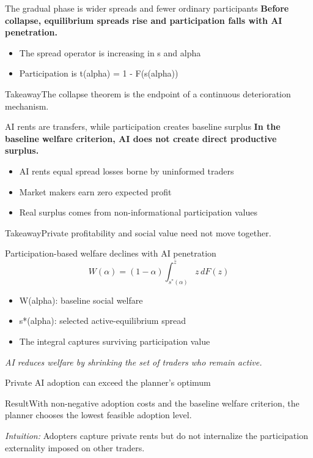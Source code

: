\documentclass[aspectratio=169,14pt]{beamer}
\begin{document}
\begin{frame}{The gradual phase is wider spreads and fewer ordinary participants}
\textbf{Before collapse, equilibrium spreads rise and participation falls with AI penetration.}
\begin{itemize}
  \item The spread operator is increasing in s and alpha
  \item Participation is t(alpha) = 1 - F(s(alpha))
\end{itemize}
\begin{block}{Takeaway}The collapse theorem is the endpoint of a continuous deterioration mechanism.\end{block}
\end{frame}

\begin{frame}{AI rents are transfers, while participation creates baseline surplus}
\textbf{In the baseline welfare criterion, AI does not create direct productive surplus.}
\begin{itemize}
  \item AI rents equal spread losses borne by uninformed traders
  \item Market makers earn zero expected profit
  \item Real surplus comes from non-informational participation values
\end{itemize}
\begin{block}{Takeaway}Private profitability and social value need not move together.\end{block}
\end{frame}

\begin{frame}{Participation-based welfare declines with AI penetration}
\begin{equation*}W(\alpha) = (1-\alpha) \int_{s^*(\alpha)}^{\bar z} z \,dF(z)\end{equation*}
\begin{itemize}
  \item W(alpha): baseline social welfare
  \item s*(alpha): selected active-equilibrium spread
  \item The integral captures surviving participation value
\end{itemize}
\textit{AI reduces welfare by shrinking the set of traders who remain active.}
\end{frame}

\begin{frame}{Private AI adoption can exceed the planner's optimum}
\begin{block}{Result}With non-negative adoption costs and the baseline welfare criterion, the planner chooses the lowest feasible adoption level.\end{block}
\textit{Intuition:} Adopters capture private rents but do not internalize the participation externality imposed on other traders.
\end{frame}
\end{document}
